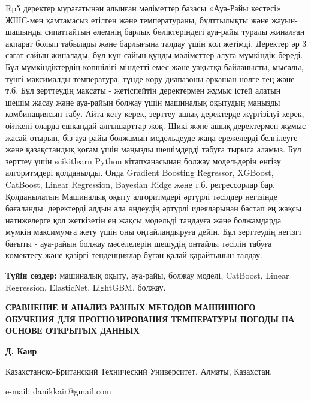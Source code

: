 Rp5 деректер мұрағатынан алынған мәліметтер базасы «Ауа-Райы кестесі»
ЖШС-мен қамтамасыз етілген және температураны, бұлттылықты және
жауын-шашынды сипаттайтын әлемнің барлық бөліктеріндегі ауа-райы туралы
жиналған ақпарат болып табылады және барлығына талдау үшін қол жетімді.
Деректер әр 3 сағат сайын жиналады, бұл күн сайын құнды мәліметтер алуға
мүмкіндік береді. Бұл мүмкіндіктердің көпшілігі міндетті емес және
уақытқа байланысты, мысалы, түнгі максималды температура, түнде көру
диапазоны әрқашан нөлге тең және т.б. Бұл зерттеудің мақсаты -
жетіспейтін деректермен жұмыс істей алатын шешім жасау және ауа-райын
болжау үшін машиналық оқытудың маңызды комбинациясын табу. Айта кету
керек, зерттеу ашық деректерде жүргізілуі керек, өйткені оларда ешқандай
алғышарттар жоқ. Шикі және ашық деректермен жұмыс жасай отырып, біз ауа
райы болжамын модельдеуде жаңа ережелерді белгілеуге және қазақстандық
қоғам үшін маңызды шешімдерді табуға тырыса аламыз. Бұл зерттеу үшін
scikitlearn Python кітапханасынан болжау модельдерін енгізу алгоритмдері
қолданылды. Онда Gradient Boosting Regressor, XGBoost, CatBoost, Linear
Regression, Bayesian Ridge және т.б. регрессорлар бар. Қолданылатын
Машиналық оқыту алгоритмдері әртүрлі тәсілдер негізінде бағаланды:
деректерді алдын ала өңдеудің әртүрлі идеяларынан бастап ең жақсы
нәтижелерге қол жеткізетін ең жақсы модельді таңдауға және болжамдарда
мүмкін максимумға жету үшін оны оңтайландыруға дейін. Бұл зерттеудің
негізгі бағыты - ауа-райын болжау мәселелерін шешудің оңтайлы тәсілін
табуға көмектесу және қазіргі тенденциялар бұған қалай қарайтынын
талдау.

{\bfseries Түйін сөздер:} машиналық оқыту, ауа-райы, болжау моделі,
CatBoost, Linear Regression, ElasticNet, LightGBM, болжау.

\begin{center}
{\large\bfseries СРАВНЕНИЕ И АНАЛИЗ РАЗНЫХ МЕТОДОВ МАШИННОГО ОБУЧЕНИЯ ДЛЯ ПРОГНОЗИРОВАНИЯ ТЕМПЕРАТУРЫ ПОГОДЫ НА ОСНОВЕ ОТКРЫТЫХ ДАННЫХ}

{\bfseries Д. Каир}

Казахстанско-Британский Технический Университет, Алматы, Казахстан,

e-mail: danikkair@gmail.com
\end{center}

